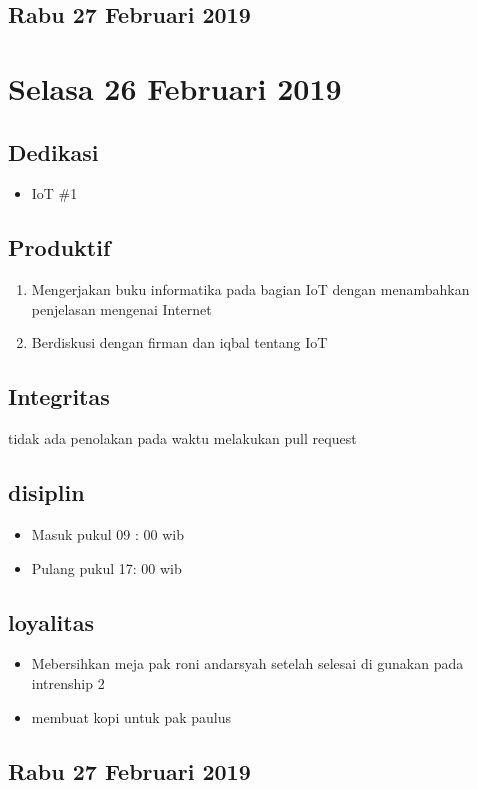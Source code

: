 \subsection{Rabu 27 Februari 2019}

\section{Selasa 26 Februari 2019}
\subsection{Dedikasi}
\begin{itemize}
    \item IoT \#1
    \end{itemize}
\subsection{Produktif}
\begin{enumerate}
  \item Mengerjakan buku informatika pada bagian IoT dengan menambahkan penjelasan mengenai Internet
  \item Berdiskusi dengan firman dan iqbal tentang IoT
\end{enumerate}
\subsection{Integritas}
tidak ada penolakan pada waktu melakukan pull request
\subsection{disiplin}
\begin{itemize}
  \item Masuk pukul 09 : 00 wib
  \item Pulang pukul 17: 00 wib
\end{itemize}
\subsection{loyalitas}
\begin{itemize}
  \item Mebersihkan meja pak roni andarsyah setelah selesai di gunakan pada intrenship 2
  \item membuat kopi untuk pak paulus
\end{itemize}


\subsection{Rabu 27 Februari 2019}
